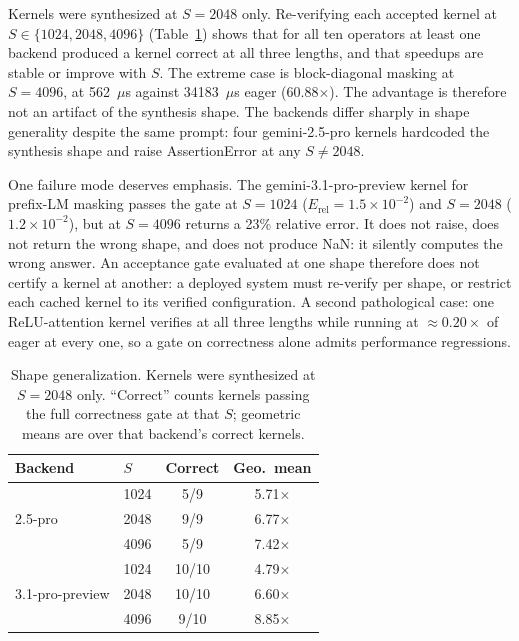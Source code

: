 \documentclass[10pt,twocolumn]{article}
\begin{document}
Kernels were synthesized at $S{=}2048$ only. Re-verifying each accepted kernel at
$S\in\{1024,2048,4096\}$ (Table~\ref{tab:shape}) shows that for all ten operators at
least one backend produced a kernel correct at all three lengths, and that speedups are
stable or improve with $S$. The extreme case is block-diagonal masking at $S{=}4096$,
at 562~$\mu$s against 34183~$\mu$s eager (60.88$\times$). The advantage is
therefore not an artifact of the synthesis shape. The backends differ sharply in shape
generality despite the same prompt: four gemini-2.5-pro kernels hardcoded the
synthesis shape and raise AssertionError at any $S\neq2048$.

One failure mode deserves emphasis. The gemini-3.1-pro-preview kernel for
prefix-LM masking passes the gate at $S{=}1024$ ($E_{\text{rel}}{=}1.5\times10^{-2}$)
and $S{=}2048$ ($1.2\times10^{-2}$), but at $S{=}4096$ returns a 23\% relative error.
It does not raise, does not return the wrong shape, and does not produce NaN: it
silently computes the wrong answer. An acceptance gate evaluated at one shape therefore
does not certify a kernel at another: a deployed system must re-verify per shape, or
restrict each cached kernel to its verified configuration. A second pathological case:
one ReLU-attention kernel verifies at all three lengths while running at
${\approx}0.20\times$ of eager at every one, so a gate on correctness alone admits
performance regressions.

\begin{table}[t]
\centering
\caption{Shape generalization. Kernels were synthesized at $S{=}2048$ only.
``Correct'' counts kernels passing the full correctness gate at that $S$; geometric
means are over that backend's correct kernels.}
\label{tab:shape}
\setlength{\tabcolsep}{3.5pt}
\begin{tabular}{llcc}
\toprule
Backend & $S$ & Correct & Geo.\ mean \\
\midrule
\multirow{3}{*}{2.5-pro}
 & 1024 & 5/9   & 5.71$\times$ \\
 & 2048 & 9/9   & 6.77$\times$ \\
 & 4096 & 5/9   & 7.42$\times$ \\
\midrule
\multirow{3}{*}{3.1-pro-preview}
 & 1024 & 10/10 & 4.79$\times$ \\
 & 2048 & 10/10 & 6.60$\times$ \\
 & 4096 & 9/10  & 8.85$\times$ \\
\bottomrule
\end{tabular}
\end{table}
\end{document}

